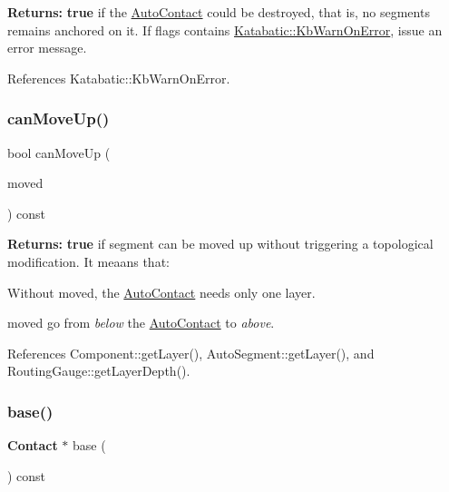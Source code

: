 {\bfseries Returns\+:} {\bfseries true} if the \mbox{\hyperlink{classKatabatic_1_1AutoContact}{Auto\+Contact}} could be destroyed, that is, no segments remains anchored on it. If {\ttfamily flags} contains \mbox{\hyperlink{namespaceKatabatic_a2af2ad6b6441614038caf59d04b3b217aa5153b2cc25ebccca8616ce20ecd727a}{Katabatic\+::\+Kb\+Warn\+On\+Error}}, issue an error message. 

References Katabatic\+::\+Kb\+Warn\+On\+Error.

\mbox{\label{classKatabatic_1_1AutoContact_a69d29e4d230a0111ca18e6e661a48f8b}} 
\subsubsection{\texorpdfstring{can\+Move\+Up()}{canMoveUp()}}
{\footnotesize\ttfamily bool can\+Move\+Up (\begin{DoxyParamCaption}\item[{const \mbox{\hyperlink{classKatabatic_1_1AutoSegment}{Auto\+Segment}} $\ast$}]{moved }\end{DoxyParamCaption}) const}

{\bfseries Returns\+:} {\bfseries true} if {\ttfamily segment} can be moved up without triggering a topological modification. It meaans that\+:
\begin{DoxyItemize}
\item Without {\ttfamily moved}, the \mbox{\hyperlink{classKatabatic_1_1AutoContact}{Auto\+Contact}} needs only one layer.
\item {\ttfamily moved} go from {\itshape below} the \mbox{\hyperlink{classKatabatic_1_1AutoContact}{Auto\+Contact}} to {\itshape above}. 
\end{DoxyItemize}

References Component\+::get\+Layer(), Auto\+Segment\+::get\+Layer(), and Routing\+Gauge\+::get\+Layer\+Depth().

\mbox{\label{classKatabatic_1_1AutoContact_ab422116c7edfacedd31711c96e3ec95b}} 
\subsubsection{\texorpdfstring{base()}{base()}}
{\footnotesize\ttfamily \textbf{ Contact} $\ast$ base (\begin{DoxyParamCaption}{ }\end{DoxyParamCaption}) const\hspace{0.3cm}{\ttfamily [inline]}}

